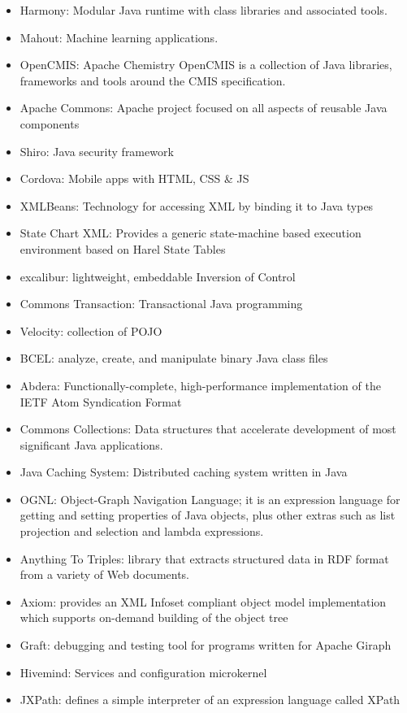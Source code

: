 \documentclass[natbib]{svjour3}
\providecommand{\tightlist}{%
  \setlength{\itemsep}{0pt}\setlength{\parskip}{0pt}}
\begin{document}
\begin{itemize}
\tightlist
\item
  Harmony: Modular Java runtime with class libraries and associated
  tools.
\item
  Mahout: Machine learning applications.
\item
  OpenCMIS: Apache Chemistry OpenCMIS is a collection of Java libraries,
  frameworks and tools around the CMIS specification.
\item
  Apache Commons: Apache project focused on all aspects of reusable Java
  components
\item
  Shiro: Java security framework
\item
  Cordova: Mobile apps with HTML, CSS \& JS
\item
  XMLBeans: Technology for accessing XML by binding it to Java types
\item
  State Chart XML: Provides a generic state-machine based execution
  environment based on Harel State Tables
\item
  excalibur: lightweight, embeddable Inversion of Control
\item
  Commons Transaction: Transactional Java programming
\item
  Velocity: collection of POJO
\item
  BCEL: analyze, create, and manipulate binary Java class files
\item
  Abdera: Functionally-complete, high-performance implementation of the
  IETF Atom Syndication Format
\item
  Commons Collections: Data structures that accelerate development of
  most significant Java applications.
\item
  Java Caching System: Distributed caching system written in Java
\item
  OGNL: Object-Graph Navigation Language; it is an expression language
  for getting and setting properties of Java objects, plus other extras
  such as list projection and selection and lambda expressions.
\item
  Anything To Triples: library that extracts structured data in RDF
  format from a variety of Web documents.
\item
  Axiom: provides an XML Infoset compliant object model implementation
  which supports on-demand building of the object tree
\item
  Graft: debugging and testing tool for programs written for Apache
  Giraph
\item
  Hivemind: Services and configuration microkernel
\item
  JXPath: defines a simple interpreter of an expression language called
  XPath
\end{itemize}
\end{document}

